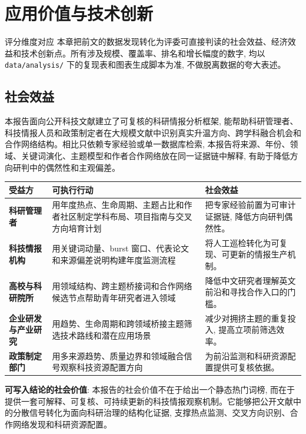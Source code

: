 \section{应用价值与技术创新}

\begin{reportbox}{评分维度对应}
本章把前文的数据发现转化为评委可直接判读的社会效益、经济效益和技术创新点。所有涉及规模、覆盖率、排名和增长幅度的数字, 均以 \texttt{data/analysis/} 下的复现表和图表生成脚本为准, 不做脱离数据的夸大表述。
\end{reportbox}

\subsection{社会效益}

本报告面向公开科技文献建立了可复核的科研情报分析框架, 能帮助科研管理者、科技情报人员和政策制定者在大规模文献中识别真实升温方向、跨学科融合机会和合作网络结构。相比只依赖专家经验或单一数据库检索, 本报告将来源、年份、领域、关键词演化、主题模型和作者合作网络放在同一证据链中解释, 有助于降低方向研判中的偶然性和主观偏差。

\begin{tableblock}
\begin{tabularx}{\textwidth}{>{\bfseries}p{31mm}X X}
\toprule
受益方 & 可执行行动 & 社会效益 \\
\midrule
科研管理者 & 用年度热点、生命周期、主题占比和作者社区制定学科布局、项目指南与交叉方向培育计划 & 把专家经验前置为可审计证据链, 降低方向研判偶然性。 \\
科技情报机构 & 用关键词动量、burst 窗口、代表论文和来源偏差说明构建年度监测流程 & 将人工巡检转化为可复现、可更新的情报生产机制。 \\
高校与科研院所 & 用领域结构、跨主题桥接词和合作网络候选节点帮助青年研究者进入领域 & 降低中文研究者理解英文前沿和寻找合作入口的门槛。 \\
企业研发与产业研究 & 用趋势、生命周期和跨领域桥接主题筛选技术路线和潜在应用场景 & 减少对拥挤主题的重复投入, 提高立项前筛选效率。 \\
政策制定部门 & 用多来源趋势、质量边界和领域融合信号观察科技资源配置方向 & 为前沿监测和科研资源配置提供可复核依据。 \\
\bottomrule
\end{tabularx}
\end{tableblock}

\begin{methodnote}
\textbf{可写入结论的社会价值}: 本报告的社会价值不在于给出一个静态热门词榜, 而在于提供一套可解释、可复核、可持续更新的科技情报观察机制。它能够把公开文献中的分散信号转化为面向科研治理的结构化证据, 支撑热点监测、交叉方向识别、合作网络发现和科研资源配置。
\end{methodnote}

